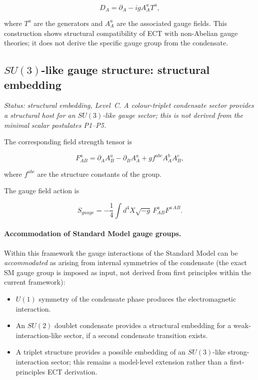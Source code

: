 \documentclass[11pt,a4paper]{article}
\numberwithin{equation}{section}
\begin{document}
\begin{equation}
D_A = \partial_A - i g A_A^a T^a ,
\end{equation}

where $T^a$ are the generators and $A_A^a$ are the associated
gauge fields.
This construction shows structural compatibility of ECT with
non-Abelian gauge theories; it does not derive the specific
gauge group from the condensate.

\subsection{$SU(3)$-like gauge structure: structural embedding}
\label{sec:su3_embedding}

\textit{Status: structural embedding, Level~C.
A colour-triplet condensate sector provides a structural host
for an $SU(3)$-like gauge sector; this is not derived from the
minimal scalar postulates P1--P5.}

The corresponding field strength tensor is

\begin{equation}
F_{AB}^a
=
\partial_A A_B^a
-
\partial_B A_A^a
+
g f^{abc}A_A^b A_B^c ,
\end{equation}

where $f^{abc}$ are the structure constants of the group.

The gauge field action is

\begin{equation}
S_{gauge}
=
-\frac{1}{4}
\int d^4X\sqrt{-g}\,
F_{AB}^a F^{a\,AB}.
\end{equation}

\paragraph{Accommodation of Standard Model gauge groups.}

Within this framework the gauge interactions of the Standard Model
can be \emph{accommodated} as arising from internal symmetries of the
condensate (the exact SM gauge group is imposed as input, not derived
from first principles within the current framework):

\begin{itemize}

\item $U(1)$ symmetry of the condensate phase produces the
electromagnetic interaction.

\item An $SU(2)$ doublet condensate provides a structural embedding
for a weak-interaction-like sector, if a second condensate transition
exists.

\item A triplet structure provides a possible embedding of an
$SU(3)$-like strong-interaction sector; this remains a model-level
extension rather than a first-principles ECT derivation.

\end{itemize}
\end{document}
